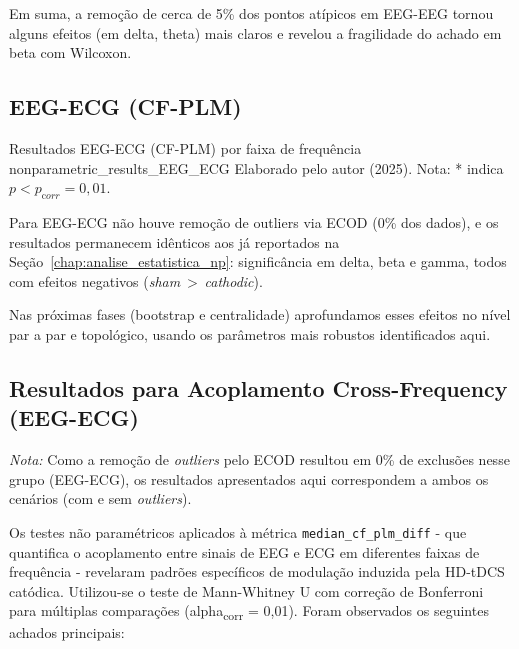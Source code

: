 Em suma, a remoção de cerca de 5\% dos pontos atípicos em EEG-EEG tornou alguns efeitos (em delta, theta) mais claros e revelou a fragilidade do achado em beta com Wilcoxon.

\subsection{EEG-ECG (CF-PLM)}

{Resultados EEG-ECG (CF-PLM) por faixa de frequência}
{nonparametric_results_EEG_ECG}
{Elaborado pelo autor (2025). Nota: * indica $p<p_{\mathrm corr}=0{,}01$.}

Para EEG-ECG não houve remoção de outliers via ECOD (0\% dos dados), e os resultados permanecem idênticos aos já reportados na Seção~\ref{chap:analise_estatistica_np}: significância em delta, beta e gamma, todos com efeitos negativos (\textit{sham} $>$ \textit{cathodic}).

\bigskip
\noindent Nas próximas fases (bootstrap e centralidade) aprofundamos esses efeitos no nível par a par e topológico, usando os parâmetros mais robustos identificados aqui.

\subsection{Resultados para Acoplamento Cross-Frequency (EEG-ECG)}

\vspace{0.3em}
\noindent\textit{Nota:} Como a remoção de \textit{outliers} pelo ECOD resultou em 0\% de exclusões nesse grupo (EEG-ECG), os resultados apresentados aqui correspondem a ambos os cenários (com e sem \textit{outliers}).

Os testes não paramétricos aplicados à métrica \texttt{median\_cf\_plm\_diff} - que quantifica o acoplamento entre sinais de EEG e ECG em diferentes faixas de frequência - revelaram padrões específicos de modulação induzida pela HD-tDCS catódica. Utilizou-se o teste de Mann-Whitney U com correção de Bonferroni para múltiplas comparações (alpha\textsubscript{corr} = 0{,}01). Foram observados os seguintes achados principais:

